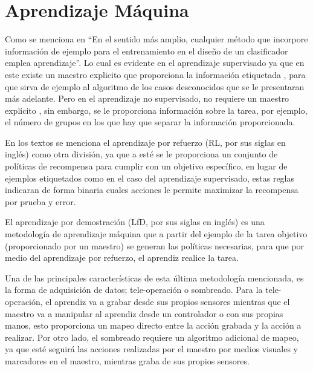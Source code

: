 \section{Aprendizaje M\'aquina}

Como se menciona en \cite{9780471056690} ``En el sentido m\'as amplio,
 cualquier m\'etodo que incorpore informaci\'on de ejemplo para el 
 entrenamiento en el dise\~no de un clasificador emplea aprendizaje''.
 Lo cual es evidente en el aprendizaje supervisado ya que en este existe 
 un maestro explicito que proporciona la informaci\'on etiquetada
 \cite{9780471056690}, para que sirva de ejemplo al algoritmo de los casos 
 desconocidos que se le presentaran m\'as adelante. Pero en el aprendizaje 
 no supervisado, no requiere un maestro explicito \cite{9780471056690}, sin 
 embargo, se le proporciona informaci\'on sobre la tarea, por ejemplo, el 
 n\'umero de grupos en los que hay que separar la informaci\'on proporcionada.


En los textos \cite{9780471056690, 9780387310732} se menciona el aprendizaje 
 por refuerzo (RL, por sus siglas en ingl\'es) como otra divisi\'on, ya que 
 a est\'e se le proporciona un conjunto de pol\'iticas de recompensa para 
 cumplir con un objetivo espec\'ifico, en lugar de ejemplos etiquetados como 
 en el caso del aprendizaje supervisado, estas reglas indicaran de forma 
 binaria cuales acciones le permite maximizar la recompensa por prueba y error.


El aprendizaje por demostraci\'on (LfD, por sus siglas en ingl\'es)
 \cite{ARGALL2009469} es una metodolog\'ia de aprendizaje m\'aquina que a 
 partir del ejemplo de la tarea objetivo (proporcionado por un maestro) 
 se generan las pol\'iticas necesarias, para que por medio del aprendizaje 
 por refuerzo, el aprendiz realice la tarea.


Una de las principales caracter\'isticas de esta \'ultima metodolog\'ia
 mencionada, es la forma de adquisici\'on de datos; tele-operaci\'on o 
 sombreado. Para la tele-operaci\'on\cite{ARGALL2009469}, el aprendiz va 
 a grabar desde sus propios sensores mientras que el maestro va a manipular 
 al aprendiz desde un controlador o con sus propias manos, esto proporciona 
 un mapeo directo entre la acci\'on grabada y la acci\'on a realizar. Por 
 otro lado, el sombreado\cite{ARGALL2009469} requiere un algoritmo adicional 
 de mapeo, ya que est\'e seguir\'a las acciones realizadas por el maestro por 
 medios visuales y marcadores en el maestro, mientras graba de sus propios 
 sensores. 


